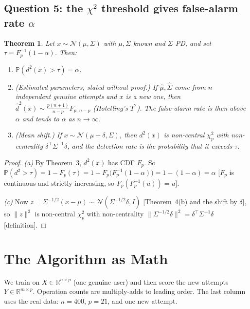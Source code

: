 \documentclass[11pt]{article}
\newcommand{\R}{\mathbb{R}}
\renewcommand{\Pr}{\mathbb{P}}
\newcommand{\T}{^{\top}}
\newcommand{\hSigma}{\hat{\Sigma}}
\newcommand{\hmu}{\hat{\mu}}
\newcommand{\norm}[1]{\lVert #1\rVert}
\theoremstyle{plain}
\newtheorem{theorem}{Theorem}
\theoremstyle{definition}
\theoremstyle{remark}
\begin{document}
\subsection{Question 5: the $\chi^2$ threshold gives false-alarm rate $\alpha$}
\begin{theorem}\label{thm:threshold}
Let $x\sim\mathcal N(\mu,\Sigma)$ with $\mu,\Sigma$ known and $\Sigma$ PD, and set
$\tau=F_p^{-1}(1-\alpha)$. Then:
\begin{enumerate}[label=(\alph*),nosep]
\item $\Pr(d^2(x)>\tau)=\alpha$.
\item (Estimated parameters, stated without proof.) If $\hmu,\hSigma$ come from $n$
 independent genuine attempts and $x$ is a new one, then
 $\hat d^2(x)\sim\frac{p(n+1)}{n-p}F_{p,\,n-p}$ (Hotelling's $T^2$). The false-alarm
 rate is then above $\alpha$ and tends to $\alpha$ as $n\to\infty$.
\item (Mean shift.) If $x\sim\mathcal N(\mu+\delta,\Sigma)$, then $d^2(x)$ is
 non-central $\chi^2_p$ with non-centrality $\delta\T\Sigma^{-1}\delta$, and the
 detection rate is the probability that it exceeds $\tau$.
\end{enumerate}
\end{theorem}
\begin{proof}
\textit{(a)} By Theorem~3, $d^2(x)$ has CDF $F_p$. So
$\Pr(d^2>\tau)=1-F_p(\tau)=1-F_p\big(F_p^{-1}(1-\alpha)\big)=1-(1-\alpha)=\alpha$
[$F_p$ is continuous and strictly increasing, so $F_p(F_p^{-1}(u))=u$].

\textit{(c)} Now $z=\Sigma^{-1/2}(x-\mu)\sim\mathcal N(\Sigma^{-1/2}\delta,I)$
[Theorem~4(b) and the shift by $\delta$], so $\norm z^2$ is non-central $\chi^2_p$ with
non-centrality $\norm{\Sigma^{-1/2}\delta}^2=\delta\T\Sigma^{-1}\delta$ [definition].
\end{proof}

\clearpage
\section{The Algorithm as Math}\label{sec:algo}
We train on $X\in\R^{n\times p}$ (one genuine user) and then score the new attempts
$Y\in\R^{m\times p}$. Operation counts are multiply-adds to leading order. The last
column uses the real data: $n=400$, $p=21$, and one new attempt.
\end{document}
